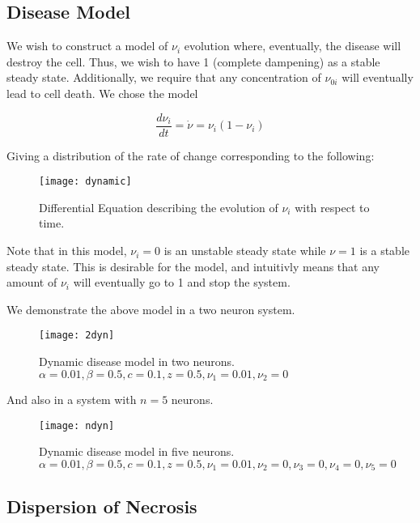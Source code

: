 \documentclass[11pt]{report}
\begin{document}
\subsection{Disease Model} %
\label{sub:disease_model}


We wish to construct a model of $\nu_{i}$ evolution where, eventually, the disease will destroy the cell. Thus, we wish to have 1 (complete dampening) as a stable steady state. Additionally, we require that any concentration of $\nu_{0i}$ will eventually lead to cell death. We chose the model

$$ \frac{d \nu_i}{dt} = \dot{\nu} = \nu_i (1 - \nu_i) $$

Giving a distribution of the rate of change corresponding to the following:

\begin{figure}[!ht]
  \caption{Differential Equation describing the evolution of $\nu_i$ with respect to time. }
  \centering
    \texttt{[image: dynamic]}
\end{figure}


Note that in this model, $\nu_i=0$ is an unstable steady state while $\nu=1$ is a stable steady state. This is desirable for the model, and intuitivly means that any amount of $\nu_i$ will eventually go to 1 and stop the system. 

We demonstrate the above model in a two neuron system.

\begin{figure}[!ht]
  \caption{Dynamic disease model in two neurons. $\alpha = 0.01, \beta = 0.5,c = 0.1,z = 0.5, \nu_1 = 0.01, \nu_2 = 0$ }
  \centering
    \texttt{[image: 2dyn]}
\end{figure}


And also in a system with $n=5$ neurons.

\begin{figure}[!ht]
  \caption{Dynamic disease model in five neurons. $\alpha = 0.01, \beta = 0.5,c = 0.1,z = 0.5, \nu_1 = 0.01, \nu_2 = 0, \nu_3 = 0, \nu_4 = 0, \nu_5 = 0$ }
  \centering
    \texttt{[image: ndyn]}
\end{figure}

\subsection{Dispersion of Necrosis} %
\label{sub:dispersion_of_necrosis}
\end{document}
